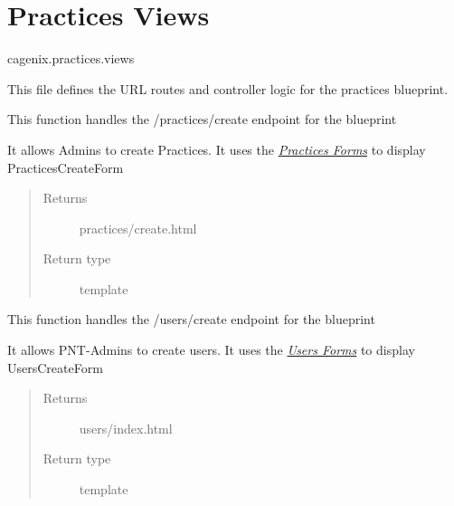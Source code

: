 \documentclass[letterpaper,10pt,english]{sphinxmanual}
\begin{document}
\section{Practices Views}
\label{dev-practices:module-cagenix.practices.views}\label{dev-practices:practices-views}\label{dev-practices:practices-views-label}
cagenix.practices.views

This file defines the URL routes and controller logic for the practices blueprint.

\begin{fulllineitems}
\label{dev-practices:cagenix.practices.views.practices_create}
This function handles the /practices/create endpoint for the blueprint

It allows Admins to create Practices.  It uses the {\hyperref[dev-practices:practices-forms-label]{\emph{Practices Forms}}}
to display PracticesCreateForm
\begin{quote}\begin{description}
\item[{Returns}] \leavevmode
practices/create.html

\item[{Return type}] \leavevmode
template

\end{description}\end{quote}

\end{fulllineitems}


\begin{fulllineitems}
\label{dev-practices:cagenix.practices.views.practices_delete}
This function handles the /users/create endpoint for the blueprint

It allows PNT-Admins to create users.  It uses the {\hyperref[dev-users:users-forms-label]{\emph{Users Forms}}}
to display UsersCreateForm
\begin{quote}\begin{description}
\item[{Returns}] \leavevmode
users/index.html

\item[{Return type}] \leavevmode
template

\end{description}\end{quote}

\end{fulllineitems}
\end{document}
